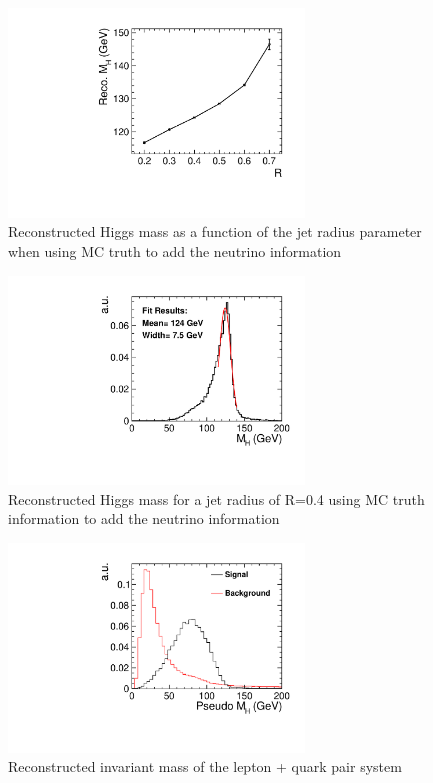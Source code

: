 \begin{figure}
  \centering
  \includegraphics[width=0.7\textwidth,keepaspectratio]{HiggsAnalysis/figures/HiggsJetOptimization.pdf}
  \caption[Jet Reconstruction Optimization]{Reconstructed Higgs mass as a function of the jet radius parameter when using MC truth to add the neutrino information}
  \label{fig:jetoptimization}
\end{figure}

\begin{figure}
  \centering
  \includegraphics[width=0.7\textwidth,keepaspectratio]{HiggsAnalysis/figures/CheatHiggs04}
  \caption[Reconstructed Higgs Mass For Optimum Jet Radius]{Reconstructed Higgs mass for a jet radius of R=0.4 using MC truth information to add the neutrino information}
  \label{fig:cheatHiggsMass}
\end{figure}

\begin{figure}
  \centering
  \includegraphics[width=0.7\textwidth,keepaspectratio]{HiggsAnalysis/figures/PseudoHiggs.pdf}
  \caption[Reconstructed Higgs Mass]{Reconstructed invariant mass of the lepton + quark pair system}
  \label{fig:pseudoHiggsMass}
\end{figure}


